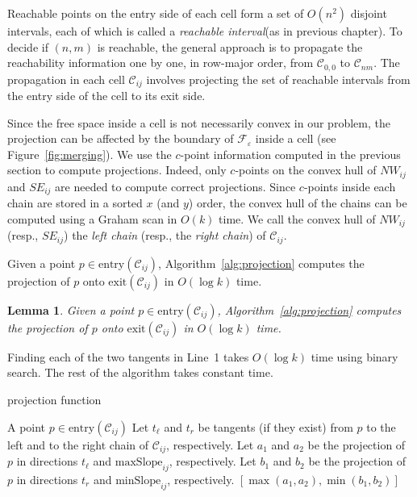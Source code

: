 \documentclass[12pt]{dalthesis}
\def\favoritefont{\bfseries \sffamily}
\def\QED{\ensuremath{{\Box}}}
\def\markatright#1{\leavevmode\unskip\nobreak\quad\hspace*{\fill}{#1}}
\newenvironment{proof}
	{\begin{trivlist}\item[\hskip\labelsep{\favoritefont Proof:}]}
	{\markatright{\QED}\end{trivlist}}
\newtheorem{lemma}[theorem]{Lemma}
\newcommand{\eps}{\varepsilon}
\newcommand{\CF}{{\mathscr F}}
\newcommand{\CC}{{\mathscr C}}
\newcommand{\cell}[1]{{\CC_{#1}}}
\newcommand{\Feps}{\CF_\eps}
\newcommand{\minS}[1]{\mbox{minSlope}_{#1}}
\newcommand{\maxS}[1]{\mbox{maxSlope}_{#1}}
\newcommand{\entry}[1]{\mbox{entry}(\cell{#1})}
\newcommand{\exit}[1]{\mbox{exit}(\cell{#1})}
\begin{document}
Reachable points on the entry side of each cell
form a set of $O(n^2)$ disjoint intervals, 
each of which is called a \emph{reachable interval}(as in previous chapter).
To decide if  $(n,m)$ is reachable,
the general approach is to propagate the reachability information
one by one, in row-major order, 
from $\cell{0,0}$ to $\cell{nm}$.
The propagation in each cell $\cell{ij}$ involves
projecting the set of reachable intervals 
from the entry side of the cell to its exit side.


Since the free space inside a cell is not necessarily convex in our problem, the projection can be affected by the boundary of $\Feps$ inside a cell
(see Figure~\ref{fig:merging}). We use the $c$-point information computed in the previous section 
to compute projections.
Indeed, only $c$-points on the convex hull of $NW_{ij}$ and $SE_{ij}$ 
are needed to compute correct projections. Since $c$-points inside each chain are stored in a sorted $x$ (and $y$) order,
the convex hull of the chains can be computed using a Graham scan in $O(k)$ time.
We call the convex hull of $NW_{ij}$ (resp., $SE_{ij}$)
the \emph{left chain} (resp., the \emph{right chain}) of $\cell{ij}$.

Given a point $p \in \entry{ij}$, Algorithm~\ref{alg:projection} 
computes the projection of 
$p$ onto $\exit{ij}$ in $O(\log k)$ time.



\begin{lemma} \label{lemma:project-point}
	Given a point $p \in \entry{ij}$, Algorithm~\ref{alg:projection} 
	computes the projection of 
	$p$ onto $\exit{ij}$ in $O(\log k)$ time.
\end{lemma}


\begin{proof}
	Finding each of the two tangents in Line~1 takes $O(\log k)$ time using binary search.
	The rest of the algorithm takes constant time.
\end{proof}


\begin{algorithm} [h]
\caption {\sc projection function} \label{alg:projection}
\begin{algorithmic}[1]
	\vspace{0.5em}
	\baselineskip
	
	\REQUIRE A point $p \in \entry{ij}$
	\STATE Let $t_\ell$ and $t_r$ be tangents (if they exist) from $p$ to the left and to the right chain of $\cell{ij}$, respectively.
	\STATE Let $a_1$ and $a_2$ be the projection of $p$ in directions $t_\ell$ and $\maxS{ij}$, respectively.	
	\STATE Let $b_1$ and $b_2$ be the projection of $p$ in directions $t_r$ and $\minS{ij}$, respectively.
	\RETURN $[\max(a_1, a_2), \min(b_1, b_2)]$
\end{algorithmic}
\end{algorithm}
\end{document}
